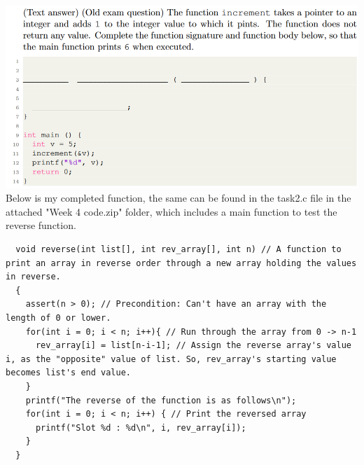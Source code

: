 \documentclass{article}
\begin{document}
\section{}
\includegraphics[width=\linewidth, keepaspectratio=true]{task2}
\vspace{2pt}\\
Below is my completed function, the same can be found in the task2.c file in the attached "Week 4 code.zip" folder, which includes a main function to test the reverse function.
\begin{lstlisting}
  void reverse(int list[], int rev_array[], int n) // A function to print an array in reverse order through a new array holding the values in reverse.
  {
    assert(n > 0); // Precondition: Can't have an array with the length of 0 or lower.
    for(int i = 0; i < n; i++){ // Run through the array from 0 -> n-1
      rev_array[i] = list[n-i-1]; // Assign the reverse array's value i, as the "opposite" value of list. So, rev_array's starting value becomes list's end value.
    }
    printf("The reverse of the function is as follows\n");
    for(int i = 0; i < n; i++) { // Print the reversed array
      printf("Slot %d : %d\n", i, rev_array[i]);
    }
  }
\end{lstlisting}
\end{document}
